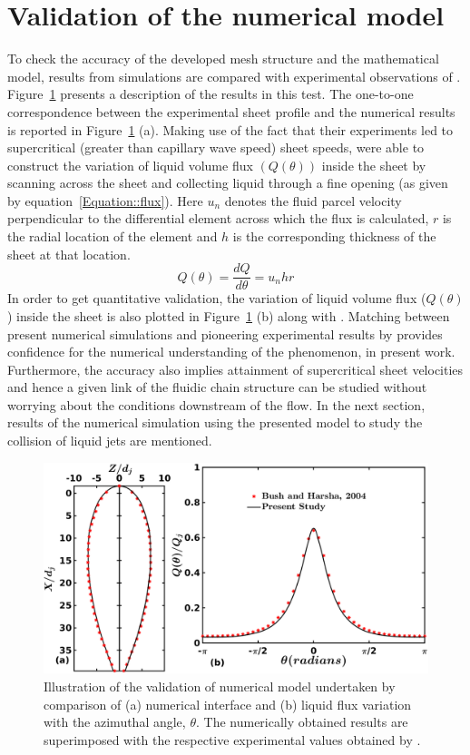 \section{Validation of the numerical model}
To check the accuracy of the developed mesh structure and the mathematical model, results from simulations are compared with experimental observations of \citet{bush2004collision}. Figure~\ref{Figure::validation} presents a description of the results in this test. The one-to-one correspondence between the experimental sheet profile \citep{bush2004collision} and the numerical results is reported in Figure~\ref{Figure::validation} (a). Making use of the fact that their experiments led to supercritical (greater than capillary wave speed) sheet speeds, \citet{bush2004collision} were able to construct the variation of liquid volume flux $\left(Q(\theta)\right)$ inside the sheet by scanning across the sheet and collecting liquid through a fine opening (as given by equation~\ref{Equation::flux}). Here $u_n$ denotes the fluid parcel velocity perpendicular to the differential element across which the flux is calculated, $r$ is the radial location of the element and $h$ is the corresponding thickness of the sheet at that location. 
\begin{equation}\label{Equation::flux}
Q(\theta) = \frac{dQ}{d\theta} = u_nhr
\end{equation}
In order to get quantitative validation, the variation of liquid volume flux ($Q(\theta)$) inside the sheet is also plotted in Figure~\ref{Figure::validation} (b) along with \citet{bush2004collision}. Matching between present numerical simulations and pioneering experimental results by \citet{bush2004collision} provides confidence for the numerical understanding of the phenomenon, in present work. Furthermore, the accuracy also implies attainment of supercritical sheet velocities and hence a given link of the fluidic chain structure can be studied without worrying about the conditions downstream of the flow. In the next section, results of the numerical simulation using the presented model to study the collision of liquid jets are mentioned.
\begin{figure}
	\centering
	\includegraphics[width=\linewidth]{chapters/jetJet/Figure3}
	\caption{Illustration of the validation of numerical model undertaken by comparison of (a) numerical interface and (b) liquid flux variation with the azimuthal angle, $\theta$. The numerically obtained results are superimposed with the respective experimental values obtained by \citet{bush2004collision}.}
	\label{Figure::validation}
\end{figure}
